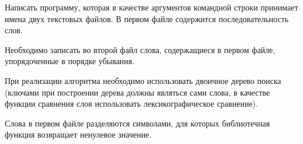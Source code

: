 

Написать программу, которая в качестве аргументов командной строки
принимает имена двух текстовых файлов. В первом файле содержится
последовательность слов.

Необходимо записать во второй файл слова,
содержащиеся в первом файле, упорядоченные в порядке убывания.

При
реализации алгоритма необходимо использовать двоичное дерево поиска
(ключами при построении дерева должны являться сами слова, в качестве
функции сравнения слов использовать лексикографическое сравнение).

Слова в первом файле разделяются символами, для которых библиотечная
функция  возвращает ненулевое значение.
